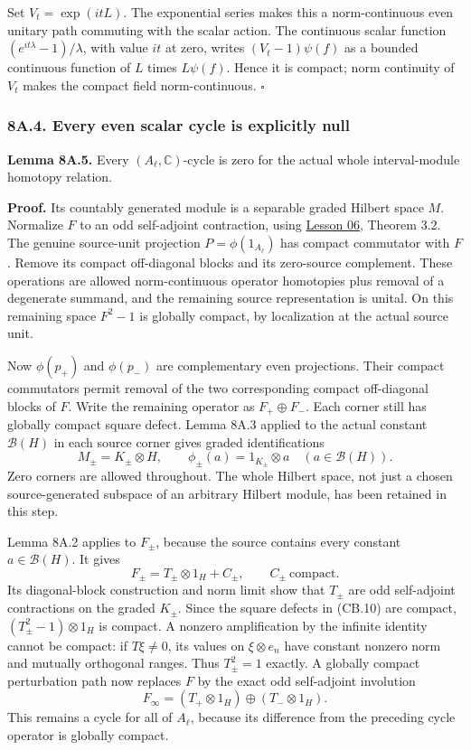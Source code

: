 \documentclass[
  11pt,
]{article}
\begin{document}
Set \(V_t=\exp(itL)\). The exponential series makes this a
norm-continuous even unitary path commuting with the scalar action. The
continuous scalar function \((e^{it\lambda}-1)/\lambda\), with value
\(it\) at zero, writes \((V_t-1)\psi(f)\) as a bounded continuous
function of \(L\) times \(L\psi(f)\). Hence it is compact; norm
continuity of \(V_t\) makes the compact field norm-continuous.
\(\square\)

\subsubsection{8A.4. Every even scalar cycle is explicitly
null}\label{a.4.-every-even-scalar-cycle-is-explicitly-null}

\textbf{Lemma 8A.5.} Every \((A_\ell,\mathbb C)\)-cycle is zero for the
actual whole interval-module homotopy relation.

\textbf{Proof.} Its countably generated module is a separable graded
Hilbert space \(M\). Normalize \(F\) to an odd self-adjoint contraction,
using \href{KT-KK-06.html}{Lesson 06}, Theorem 3.2. The genuine
source-unit projection \(P=\phi(1_{A_\ell})\) has compact commutator
with \(F\). Remove its compact off-diagonal blocks and its zero-source
complement. These operations are allowed norm-continuous operator
homotopies plus removal of a degenerate summand, and the remaining
source representation is unital. On this remaining space \(F^2-1\) is
globally compact, by localization at the actual source unit.

Now \(\phi(p_+)\) and \(\phi(p_-)\) are complementary even projections.
Their compact commutators permit removal of the two corresponding
compact off-diagonal blocks of \(F\). Write the remaining operator as
\(F_+\oplus F_-\). Each corner still has globally compact square defect.
Lemma 8A.3 applied to the actual constant \(\mathcal B(H)\) in each
source corner gives graded identifications \[
 M_\pm=K_\pm\otimes H,
 \qquad \phi_\pm(a)=1_{K_\pm}\otimes a
 \quad(a\in\mathcal B(H)).
 \tag{CB.9}
\] Zero corners are allowed throughout. The whole Hilbert space, not
just a chosen source-generated subspace of an arbitrary Hilbert module,
has been retained in this step.

Lemma 8A.2 applies to \(F_\pm\), because the source contains every
constant \(a\in\mathcal B(H)\). It gives \[
 F_\pm=T_\pm\otimes1_H+C_\pm,
 \qquad C_\pm\ \mathrm{compact}.
 \tag{CB.10}
\] Its diagonal-block construction and norm limit show that \(T_\pm\)
are odd self-adjoint contractions on the graded \(K_\pm\). Since the
square defects in (CB.10) are compact, \((T_\pm^2-1)\otimes1_H\) is
compact. A nonzero amplification by the infinite identity cannot be
compact: if \(T\xi\ne0\), its values on \(\xi\otimes e_n\) have constant
nonzero norm and mutually orthogonal ranges. Thus \(T_\pm^2=1\) exactly.
A globally compact perturbation path now replaces \(F\) by the exact odd
self-adjoint involution \[
 F_\infty=(T_+\otimes1_H)\oplus(T_-\otimes1_H).
 \tag{CB.11}
\] This remains a cycle for all of \(A_\ell\), because its difference
from the preceding cycle operator is globally compact.
\end{document}

